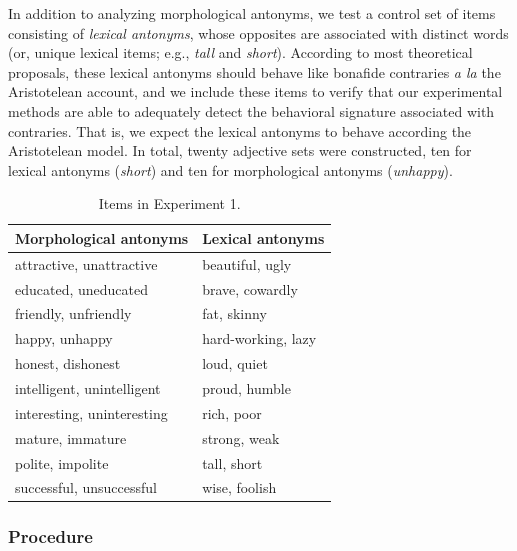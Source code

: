 \documentclass[floatsintext,doc]{apa6}
\begin{document}
In addition to analyzing morphological antonyms, we test a control set of items consisting of \emph{lexical antonyms}, whose opposites are associated with distinct words (or, unique lexical items; e.g., \emph{tall} and \emph{short}). 
According to most theoretical proposals, these lexical antonyms should behave like bonafide contraries \emph{a la} the Aristotelean account, and we include these items to verify that our experimental methods are able to adequately detect the behavioral signature associated with contraries. 
That is, we expect the lexical antonyms to behave according the Aristotelean model.
In total, twenty adjective sets were constructed, ten for lexical antonyms (\emph{short}) and ten for morphological antonyms (\emph{unhappy}). 

\begin{table}[h]
\centering
\begingroup\fontsize{10pt}{11pt}\selectfont
\begin{tabular}{ll}
  \hline
Morphological antonyms & Lexical antonyms \\ 
  \hline
attractive, unattractive & beautiful, ugly \\ 
  educated, uneducated & brave, cowardly \\ 
  friendly, unfriendly & fat, skinny \\ 
  happy, unhappy & hard-working, lazy \\ 
  honest, dishonest & loud, quiet \\ 
  intelligent, unintelligent & proud, humble \\ 
  interesting, uninteresting & rich, poor \\ 
  mature, immature & strong, weak \\ 
  polite, impolite & tall, short \\ 
  successful, unsuccessful & wise, foolish \\ 
   \hline
\end{tabular}
\endgroup
\caption{Items in Experiment 1.}
\label{tab:Items}
\end{table}


\subsubsection{Procedure}\label{procedure}
\end{document}

